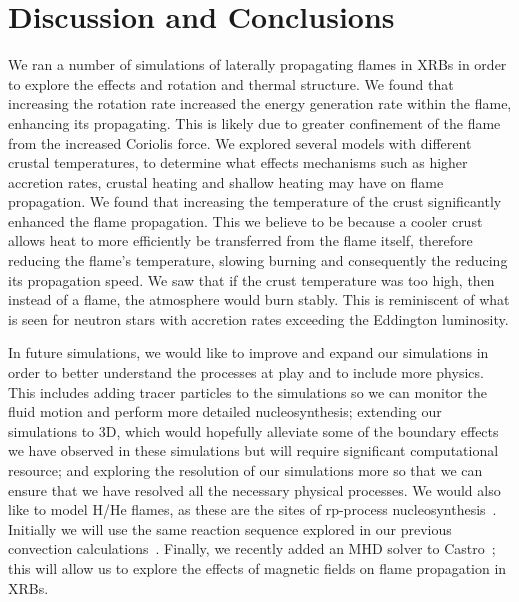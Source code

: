 \documentclass[preprint,times,tighten]{aastex63}
\newcommand{\castro}{{\sf Castro}}
\begin{document}
\section{Discussion and Conclusions}\label{Sec:conclusions}

We ran a number of simulations of laterally propagating flames in XRBs in order to explore the effects and rotation and thermal structure. We found that increasing the rotation rate increased the energy generation rate within the flame, enhancing its propagating. This is likely due to greater confinement of the flame from the increased Coriolis force. We explored several models with different crustal temperatures, to determine what effects mechanisms such as higher accretion rates, crustal heating and shallow heating may have on flame propagation. We found that increasing the temperature of the crust significantly enhanced the flame propagation. This we believe to be because a cooler crust allows heat to more efficiently be transferred from the flame itself, therefore reducing the flame's temperature, slowing burning and consequently the reducing its propagation speed. We saw that if the crust temperature was too high, then instead of a flame, the atmosphere would burn stably. This is reminiscent of what is seen for neutron stars with accretion rates exceeding the Eddington luminosity.

In future simulations, we would like to improve and expand our
simulations in order to better understand the processes at play and to
include more physics. This includes adding tracer particles to the
simulations so we can monitor the fluid motion and perform more
detailed nucleosynthesis; extending our simulations to 3D, which would
hopefully alleviate some of the boundary effects we have observed in
these simulations but will require significant computational resource;
and exploring the resolution of our simulations more so that we can
ensure that we have resolved all the necessary physical processes. We
would also like to model H/He flames, as these are the sites of
rp-process nucleosynthesis~\citep{rpprocess}.  Initially we will use the same reaction
sequence explored in our previous convection
calculations~\citep{xrb2}.   Finally, we
recently added an MHD solver to \castro~\citep{sazo2020thesis}; this
will allow us to explore the effects of magnetic fields on flame
propagation in XRBs.
\end{document}
